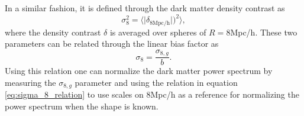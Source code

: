 In a similar fashion, it is defined through the dark matter density contrast as
\begin{equation}
    \sigma_8^2=\Big\langle\vert\delta_{8\mathrm{Mpc/h}}\vert\Big)^2\Big\rangle,
\end{equation}
where the density contrast $\delta$ is averaged over spheres of $R=8$Mpc/h.
These two parameters can be related through the linear bias factor as
\begin{equation}\label{eq:sigma_8_relation}
    \sigma_8=\frac{\sigma_{8,g}}{b}.
\end{equation}
Using this relation one can normalize the dark matter power spectrum by measuring the $\sigma_{8,g}$ parameter and using the relation in equation \ref{eq:sigma_8_relation} to use scales on $8$Mpc/h as a reference for normalizing the power spectrum when the shape is known.
